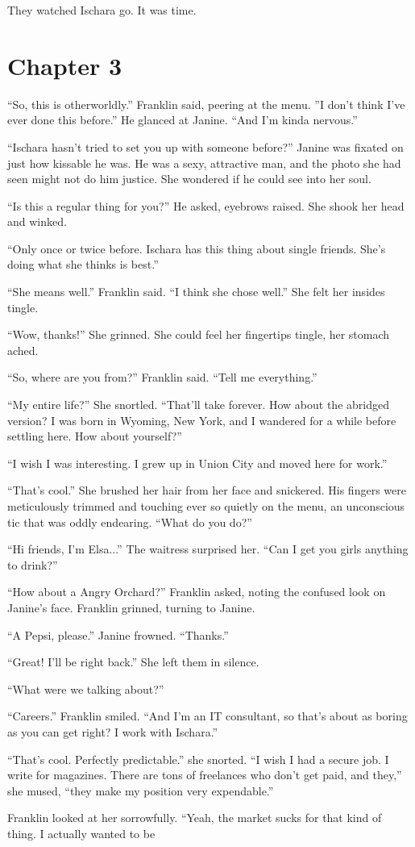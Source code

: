 They watched Ischara go. It was time. \par \chapter{Chapter 3} \par  ``So, this is otherworldly.'' Franklin said, peering at the menu. ''I don't think I've ever done this before.'' He glanced at Janine. ``And I'm kinda nervous.'' \par ``Ischara hasn't tried to set you up with someone before?'' Janine was fixated on just how kissable he was. He was a sexy, attractive man, and the photo she had seen might not do him justice. She wondered if he could see into her soul. \par ``Is this a regular thing for you?'' He asked, eyebrows raised. She shook her head and winked. \par ``Only once or twice before. Ischara has this thing about single friends. She's doing what she thinks is best.'' \par ``She means well.'' Franklin said. ``I think she chose well.'' She felt her insides tingle. \par ``Wow, thanks!'' She grinned. She could feel her fingertips tingle, her stomach ached. \par ``So, where are you from?'' Franklin said. ``Tell me everything.'' \par ``My entire life?'' She snortled. ``That'll take forever. How about the abridged version? I was born in Wyoming, New York, and I wandered for a while before settling here. How about yourself?'' \par ``I wish I was interesting. I grew up in Union City and moved here for work.'' \par ``That's cool.'' She brushed her hair from her face and snickered. His fingers were meticulously trimmed and touching ever so quietly on the menu, an unconscious tic that was oddly endearing. ``What do you do?'' \par ``Hi friends, I'm Elsa...'' The waitress surprised her. ``Can I get you girls anything to drink?'' \par ``How about a Angry Orchard?'' Franklin asked, noting the confused look on Janine's face. Franklin grinned, turning to Janine. \par ``A Pepsi, please.'' Janine frowned. ``Thanks.'' \par ``Great! I'll be right back.'' She left them in silence. \par ``What were we talking about?'' \par ``Careers.'' Franklin smiled. ``And I'm an IT consultant, so that's about as boring as you can get right? I work with Ischara.'' \par ``That's cool. Perfectly predictable.'' she snorted. ``I wish I had a secure job. I write for magazines. There are tons of freelances who don't get paid, and they,'' she mused, ``they make my position very expendable.'' \par Franklin looked at her sorrowfully. ``Yeah, the market sucks for that kind of thing. I actually wanted to be 